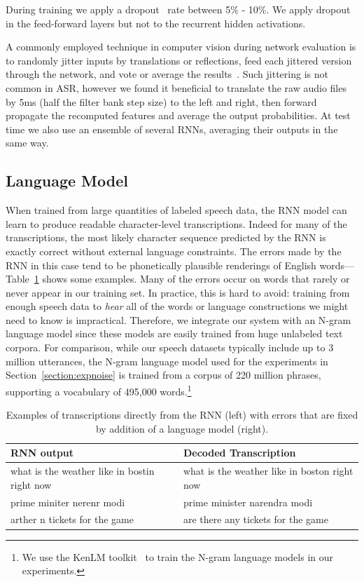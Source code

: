 \documentclass{article}
\begin{document}
During training we apply a dropout~\cite{hinton2012dropout} rate between 5\% -
10\%. We apply dropout in the feed-forward layers but not to the recurrent
hidden activations.

A commonly employed technique in computer vision during network evaluation is
to randomly jitter inputs by translations or reflections, feed each jittered
version through the network, and vote or average the
results~\cite{krizhevsky2012imagenet}. Such jittering is not common in ASR,
however we found it beneficial to translate the raw audio files by 5ms (half
the filter bank step size) to the left and right, then forward propagate the
recomputed features and average the output probabilities. At test time we also
use an ensemble of several RNNs, averaging their outputs in the same way.

\subsection{Language Model}
\label{section:languagemodel}

When trained from large quantities of labeled speech data, the RNN model can
learn to produce readable character-level transcriptions.  Indeed for many of
the transcriptions, the most likely character sequence predicted by the RNN is
exactly correct without external language constraints.  The errors made by the
RNN in this case tend to be phonetically plausible renderings of English
words---Table~\ref{table:max_decoded} shows some examples.  Many of the errors
occur on words that rarely or never appear in our training set.  In practice,
this is hard to avoid:  training from enough speech data to \emph{hear} all of
the words or language constructions we might need to know is impractical.
Therefore, we integrate our system with an N-gram language model since these
models are easily trained from huge unlabeled text corpora.  For comparison,
while our speech datasets typically include up to 3 million utterances, the
N-gram language model used for the experiments in
Section~\ref{section:expnoise} is trained from a corpus of 220 million phrases,
supporting a vocabulary of 495,000 words.\footnote{We use the KenLM
toolkit~\cite{heafield2013kenlm} to train the N-gram language models in our
experiments.} 

\begin{table}[h]
\centering
\begin{tabular}{l | l}
\toprule
RNN output  & Decoded Transcription   \\
\midrule
what is the weather like in bostin right now & what is the weather like in boston right now \\
prime miniter nerenr modi   & prime minister narendra modi     \\ 
arther n tickets for the game  & are there any tickets for the game        \\ 
\bottomrule
\end{tabular}
\caption{Examples of transcriptions directly from the RNN (left) with errors that are fixed by addition of a language model (right).}
\label{table:max_decoded}
\end{table}
\end{document}
